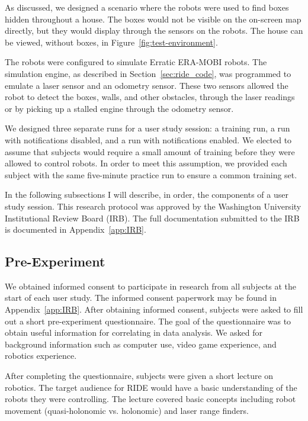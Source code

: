 As discussed, we designed a scenario where the robots were used to find boxes hidden throughout a house. The boxes would not be visible on the on-screen map directly, but they would display through the sensors on the robots. The house can be viewed, without boxes, in Figure~\ref{fig:test-environment}. 

The robots were configured to simulate Erratic ERA-MOBI robots. The simulation engine, as described in Section~\ref{sec:ride_code}, was programmed to emulate a laser sensor and an odometry sensor. These two sensors allowed the robot to detect the boxes, walls, and other obstacles, through the laser readings or by picking up a stalled engine through the odometry sensor.

We designed three separate runs for a user study session: a training run, a run with notifications disabled, and a run with notifications enabled. We elected to assume that subjects would require a small amount of training before they were allowed to control robots. In order to meet this assumption, we provided each subject with the same five-minute practice run to ensure a common training set.

In the following subsections I will describe, in order, the components of a user study session. This research protocol was approved by the Washington University Institutional Review Board (IRB). The full documentation submitted to the IRB is documented in Appendix~\ref{app:IRB}.

\subsection{Pre-Experiment} %
\label{sub:pre_experiment}
We obtained informed consent to participate in research from all subjects at the start of each user study. The informed consent paperwork may be found in Appendix~\ref{app:IRB}. After obtaining informed consent, subjects were asked to fill out a short pre-experiment questionnaire. The goal of the questionnaire was to obtain useful information for correlating in data analysis. We asked for background information such as computer use, video game experience, and robotics experience.

After completing the questionnaire, subjects were given a short lecture on robotics. The target audience for RIDE would have a basic understanding of the robots they were controlling. The lecture covered basic concepts including robot movement (quasi-holonomic vs. holonomic) and laser range finders.

